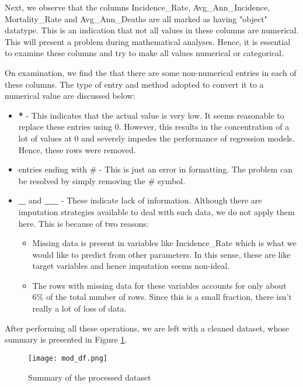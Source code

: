 \documentclass[conference]{IEEEtran}
\begin{document}
Next, we observe that the columns Incidence\_Rate, Avg\_Ann\_Incidence, Mortality\_Rate and Avg\_Ann\_Deaths are all marked as having "object" datatype. This is an indication that not all values in these columns are numerical. This will present a problem during mathematical analyses. Hence, it is essential to examine these columns and try to make all values numerical or categorical.

On examination, we find the that there are some non-numerical entries in each of these columns. The type of entry and method adopted to convert it to a numerical value are discussed below:

\begin{itemize}
    \item \textbf{*} - This indicates that the actual value is very low. It seems reasonable to replace these entries using 0. However, this results in the concentration of a lot of values at 0 and severely impedes the performance of regression models. Hence, these rows were removed.
    \item entries ending with \# - This is just an error in formatting. The problem can be resolved by simply removing the \# symbol.
    \item \textbf{\_} and \textbf{\_\_} - These indicate lack of information. Although there are imputation strategies available to deal with such data, we do not apply them here. This is because of two reasons:
    \begin{itemize}
        \item Missing data is present in variables like Incidence\_Rate which is what we would like to predict from other parameters. In this sense, these are like target variables and hence imputation seems non-ideal.
        \item The rows with missing data for these variables accounts for only about 6\% of the total number of rows. Since this is a small fraction, there isn't really a lot of loss of data.
    \end{itemize}
\end{itemize}

After performing all these operations, we are left with a cleaned dataset, whose summary is presented in Figure \ref{mod_df}.

\begin{figure}[tbh]
\centering
\texttt{[image: mod\_df.png]}
\caption{Summary of the processed dataset}
\label{mod_df}
\end{figure}
\end{document}
